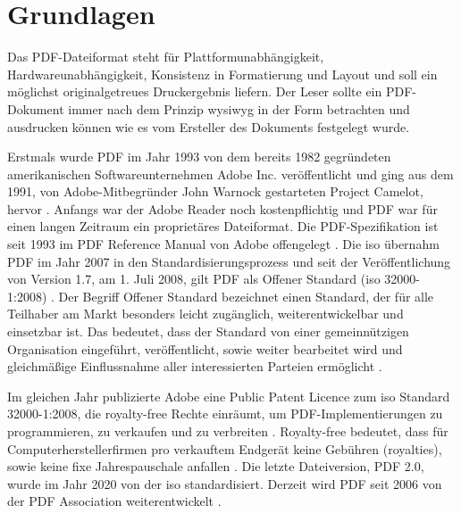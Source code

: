 \chapter{Grundlagen}
Das PDF-Dateiformat steht für Plattformunabhängigkeit, Hardwareunabhängigkeit, Konsistenz in Formatierung und Layout und soll ein möglichst originalgetreues Druckergebnis liefern. Der Leser sollte ein PDF-Dokument immer nach dem Prinzip \gls{wysiwyg} in der Form betrachten und ausdrucken können wie es vom Ersteller des Dokuments festgelegt wurde.
\par
Erstmals wurde PDF im Jahr 1993 von dem bereits 1982 gegründeten amerikanischen Softwareunternehmen Adobe Inc. veröffentlicht und ging aus dem 1991, von Adobe-Mitbegründer John Warnock gestarteten Project Camelot, hervor \cite{wiki-pdf-de}. Anfangs war der Adobe Reader noch kostenpflichtig und PDF war für einen langen Zeitraum ein proprietäres Dateiformat. Die PDF-Spezifikation ist seit 1993 im PDF Reference Manual von Adobe offengelegt \cite{wiki-pdf-engl}. Die \gls{iso} übernahm PDF im Jahr 2007 in den Standardisierungsprozess und seit der Veröffentlichung von Version 1.7, am 1. Juli 2008, gilt PDF als Offener Standard (\gls{iso} 32000-1:2008) \cite{wiki-pdf-de, wiki-pdf-engl}. Der Begriff Offener Standard bezeichnet einen Standard, der für alle Teilhaber am Markt besonders leicht zugänglich, weiterentwickelbar und einsetzbar ist. Das bedeutet, dass der Standard von einer gemeinnützigen Organisation eingeführt, veröffentlicht, sowie weiter bearbeitet wird und gleichmäßige Einflussnahme aller interessierten Parteien ermöglicht \cite{wiki-standard}.
\par
Im gleichen Jahr publizierte Adobe eine Public Patent Licence zum \gls{iso} Standard 32000-1:2008, die royalty-free Rechte einräumt, um PDF-Implementierungen zu programmieren, zu verkaufen und zu verbreiten \cite{wiki-pdf-engl}. Royalty-free bedeutet, dass für Computerherstellerfirmen pro verkauftem Endgerät keine Gebühren (royalties), sowie keine fixe Jahrespauschale anfallen \cite{wiki-roy-free}. Die letzte Dateiversion, PDF 2.0, wurde im Jahr 2020 von der \gls{iso} standardisiert. Derzeit wird PDF seit 2006 von der PDF Association weiterentwickelt \cite{wiki-pdf-de}. 






